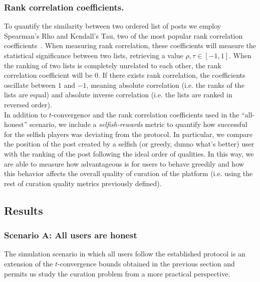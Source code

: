     \subsubsection*{Rank correlation coefficients.}
      To quantify the similarity between two ordered list of posts we employ
      Spearman's Rho and Kendall's Tau, two of the most popular rank correlation
      coefficients~\cite{kendall1955rank}.  When measuring rank correlation,
      these coefficients will measure the statistical significance between two
      lists, retrieving a value $\rho,\tau \in [-1 , 1]$. When the ranking of
      two lists is completely unrelated to each other, the rank correlation
      coefficient will be $0$. If there exists rank correlation, the
      coefficients oscillate between $1$ and $-1$, meaning absolute correlation
      (i.e. the ranks of the lists are equal) and absolute inverse correlation
      (i.e. the lists are ranked in reversed order).\\

    In addition to $t$-convergence and the rank correlation coefficients
    used in the ``all-honest'' scenario, we include a \textit{selfish-rewards}
    metric to quantify how successful for the selfish players was deviating from
    the protocol. In particular, we compare the position of the post created by
    a selfish (or greedy, dunno what's better) user with the ranking of the post
    following the ideal order of qualities. In this way, we are able to measure
    how advantageous is for users to behave greedily and how this behavior
    affects the overall quality of curation of the platform (i.e. using the rest
    of curation quality metrics previously defined).

  \subsection{Results}

    \subsubsection*{Scenario A: All users are honest}
      The simulation scenario in which all users follow the established protocol
      is an extension of the $t$-convergence bounds obtained in the previous
      section and permits us study the curation problem from a more practical
      perspective.

